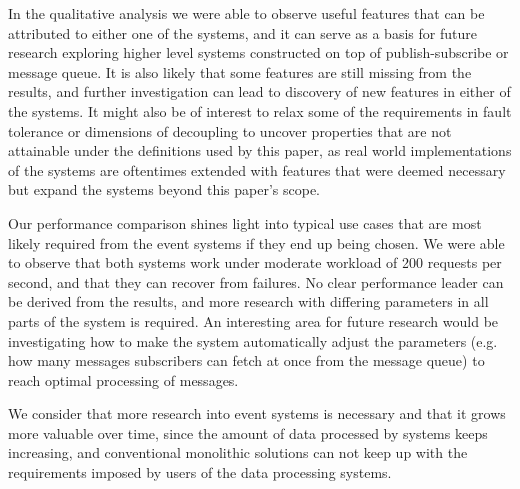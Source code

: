 \documentclass[conference]{IEEEtran}
\begin{document}
In the qualitative analysis we were able to observe useful features that can be attributed to either one of the systems, and it can serve as a basis for future research exploring higher level systems constructed on top of publish-subscribe or message queue. It is also likely that some features are still missing from the results, and further investigation can lead to discovery of new features in either of the systems. It might also be of interest to relax some of the requirements in fault tolerance or dimensions of decoupling to uncover properties that are not attainable under the definitions used by this paper, as real world implementations of the systems are oftentimes extended with features that were deemed necessary but expand the systems beyond this paper's scope.

Our performance comparison shines light into typical use cases that are most likely required from the event systems if they end up being chosen. We were able to observe that both systems work under moderate workload of 200 requests per second, and that they can recover from failures. No clear performance leader can be derived from the results, and more research with differing parameters in all parts of the system is required. An interesting area for future research would be investigating how to make the system automatically adjust the parameters (e.g. how many messages subscribers can fetch at once from the message queue) to reach optimal processing of messages.

We consider that more research into event systems is necessary and that it grows more valuable over time, since the amount of data processed by systems keeps increasing, and conventional monolithic solutions can not keep up with the requirements imposed by users of the data processing systems.
\end{document}
